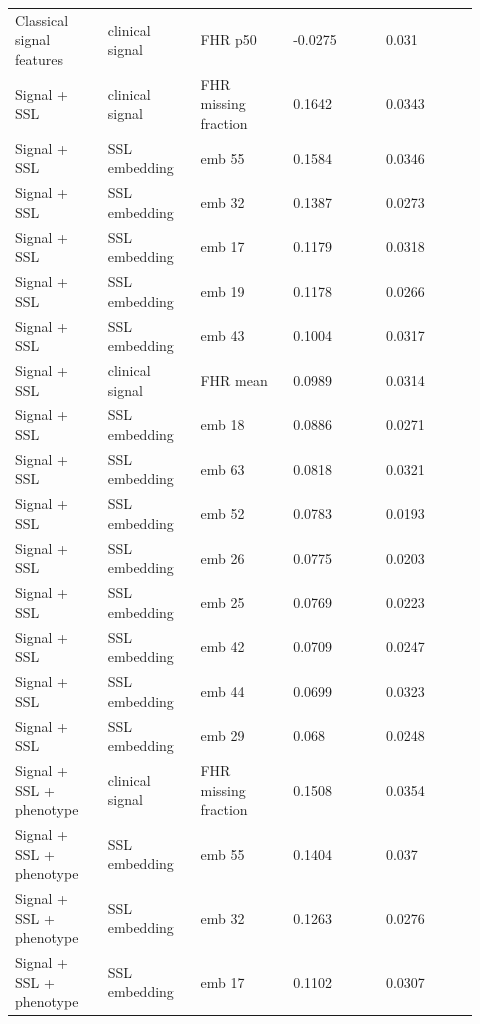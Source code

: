 \documentclass[utf8]{frontiers_suppmat}
\begin{document}
\begin{landscape}
\begin{longtable}{L{0.184\linewidth} L{0.184\linewidth} L{0.184\linewidth} L{0.184\linewidth} L{0.184\linewidth}}
Classical signal features & clinical signal & FHR p50 & -\allowbreak{}0.\allowbreak{}0275 & 0.\allowbreak{}031 \\
Signal + SSL & clinical signal & FHR missing fraction & 0.\allowbreak{}1642 & 0.\allowbreak{}0343 \\
Signal + SSL & SSL embedding & emb 55 & 0.\allowbreak{}1584 & 0.\allowbreak{}0346 \\
Signal + SSL & SSL embedding & emb 32 & 0.\allowbreak{}1387 & 0.\allowbreak{}0273 \\
Signal + SSL & SSL embedding & emb 17 & 0.\allowbreak{}1179 & 0.\allowbreak{}0318 \\
Signal + SSL & SSL embedding & emb 19 & 0.\allowbreak{}1178 & 0.\allowbreak{}0266 \\
Signal + SSL & SSL embedding & emb 43 & 0.\allowbreak{}1004 & 0.\allowbreak{}0317 \\
Signal + SSL & clinical signal & FHR mean & 0.\allowbreak{}0989 & 0.\allowbreak{}0314 \\
Signal + SSL & SSL embedding & emb 18 & 0.\allowbreak{}0886 & 0.\allowbreak{}0271 \\
Signal + SSL & SSL embedding & emb 63 & 0.\allowbreak{}0818 & 0.\allowbreak{}0321 \\
Signal + SSL & SSL embedding & emb 52 & 0.\allowbreak{}0783 & 0.\allowbreak{}0193 \\
Signal + SSL & SSL embedding & emb 26 & 0.\allowbreak{}0775 & 0.\allowbreak{}0203 \\
Signal + SSL & SSL embedding & emb 25 & 0.\allowbreak{}0769 & 0.\allowbreak{}0223 \\
Signal + SSL & SSL embedding & emb 42 & 0.\allowbreak{}0709 & 0.\allowbreak{}0247 \\
Signal + SSL & SSL embedding & emb 44 & 0.\allowbreak{}0699 & 0.\allowbreak{}0323 \\
Signal + SSL & SSL embedding & emb 29 & 0.\allowbreak{}068 & 0.\allowbreak{}0248 \\
Signal + SSL + phenotype & clinical signal & FHR missing fraction & 0.\allowbreak{}1508 & 0.\allowbreak{}0354 \\
Signal + SSL + phenotype & SSL embedding & emb 55 & 0.\allowbreak{}1404 & 0.\allowbreak{}037 \\
Signal + SSL + phenotype & SSL embedding & emb 32 & 0.\allowbreak{}1263 & 0.\allowbreak{}0276 \\
Signal + SSL + phenotype & SSL embedding & emb 17 & 0.\allowbreak{}1102 & 0.\allowbreak{}0307 \\

\end{longtable}
\end{landscape}
\end{document}

